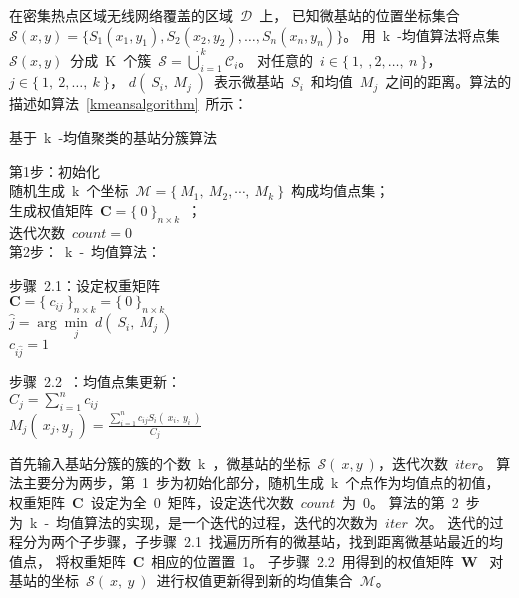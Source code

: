 在密集热点区域无线网络覆盖的区域~$\mathcal{D}$~上，
已知微基站的位置坐标集合~$\mathcal{S}(x,y) = \{S_1(x_1,y_1), S_2(x_2,y_2),\dots,S_n(x_n,y_n)\}$。
用~k~-均值算法将点集~$\mathcal{S}(x,y)$~分成~K~个簇~$\mathcal{S} = \dot{\bigcup}_{i=1}^{k} \mathcal{C}_i$。
对任意的~$i\in\{~1,~,2,\dots,~n~\}$，$j\in\{~1,~2,\dots,~k~\}$，
$d(~S_i,~M_j~)$~表示微基站~$S_i$~和均值~$M_j$~之间的距离。算法的描述如算法~\ref{kmeansalgorithm}~所示：
\begin{algorithm}[!htb]
\caption{ 基于~k~-均值聚类的基站分簇算法 }
\label{kmeansalgorithm}
\small
{}
\Begin
{
    第1步：初始化\\
    随机生成~k~个坐标~$\mathcal{M}=\{~M_1,~M_2,\cdots,~M_k~\}$~构成均值点集；\\
    生成权值矩阵~$\mathbf{C}=\{~0~\}_{n\times k}$~；\\
    迭代次数~$count=0$~\\

    第2步：~k~-~均值算法：\\
    {
      步骤~2.1：设定权重矩阵\\
      $\mathbf{C}=\{~c_{ij}~\}_{n\times k}=\{~0~\}_{n\times k}$\\
      {
        $\hat{j}=\arg\min\limits_{j} ~d(~S_i,~M_j~)$ \\
        $c_{i\hat{j}}=1$  \\
      }

      步骤~2.2~：均值点集更新：\\
      {
        $C_j = \sum_{i=1}^n c_{ij}$  \\
        $M_j(~x_j, y_j~) = \frac{\sum_{i=1}^{n} c_{ij} S_i(~x_i,~y_i~)}{C_j}$  \\
      }
    }
}
\end{algorithm}

首先输入基站分簇的簇的个数~k~，微基站的坐标~$\mathcal{S}(~x,y~)$，迭代次数~$iter$。
算法主要分为两步，第~1~步为初始化部分，随机生成~k~个点作为均值点的初值，
权重矩阵~$\mathbf{C}$~设定为全~0~矩阵，设定迭代次数~$count$~为~0。
算法的第~2~步为~k~-~均值算法的实现，是一个迭代的过程，迭代的次数为~$iter$~次。
迭代的过程分为两个子步骤，子步骤~2.1~找遍历所有的微基站，找到距离微基站最近的均值点，
将权重矩阵~$\mathbf{C}$~相应的位置置~1。
子步骤~2.2~用得到的权值矩阵~$\mathbf{W}$~
对基站的坐标~$\mathcal{S}(~x,~y~)$~进行权值更新得到新的均值集合~$\mathcal{M}$。

